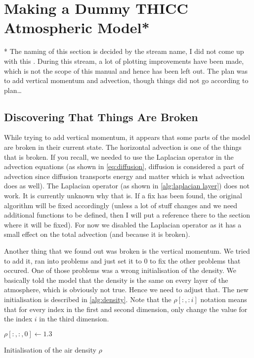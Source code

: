 \section{Making a Dummy THICC Atmospheric Model*}
* The naming of this section is decided by the stream name, I did not come up with this \cite{twitch}. During this stream, a lot of plotting improvements have been made, which is not the scope of
this manual and hence has been left out. The plan was to add vertical momentum and advection, though things did not go according to plan\dots

\subsection{Discovering That Things Are Broken}
While trying to add vertical momentum, it appears that some parts of the model are broken in their current state. The horizontal advection is one of the things that is broken. If you recall, 
we needed to use the Laplacian operator in the advection equations (as shown in \autoref{eq:diffusion}, diffusion is considered a part of advection since diffusion transports energy and matter
which is what advection does as well). The Laplacian operator (as shown in \autoref{alg:laplacian layer}) does not work. It is currently unknown why that is. If a fix has been found, the original
algorithm will be fixed accordingly (unless a lot of stuff changes and we need additional functions to be defined, then I will put a reference there to the section where it will be fixed). For 
now we disabled the Laplacian operator as it has a small effect on the total advection (and because it is broken).

Another thing that we found out was broken is the vertical momentum. We tried to add it, ran into problems and just set it to 0 to fix the other problems that occured. One of those problems was 
a wrong initialisation of the density. We basically told the model that the density is the same on every layer of the atmosphere, which is obviously not true. Hence we need to adjust that. The 
new initialisation is described in \autoref{alg:density}. Note that the $\rho[:,: i]$ notation means that for every index in the first and second dimension, only change the value for the index $i$
in the third dimension.

\begin{algorithm}
    $\rho[:, :, 0] \leftarrow 1.3$ \;
    \caption{Initialisation of the air density $\rho$}
    \label{alg:density}
\end{algorithm}